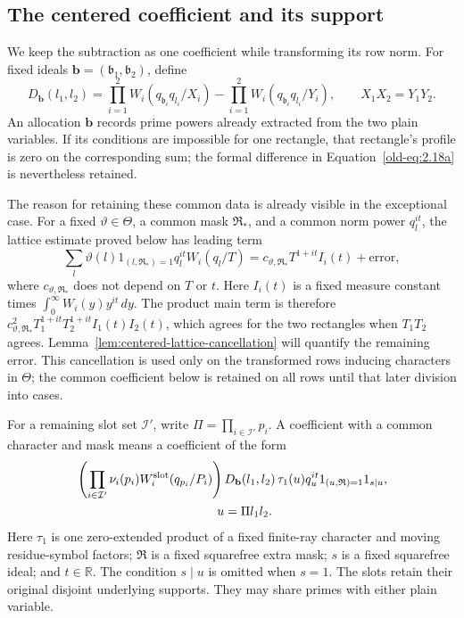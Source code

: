 \documentclass[12pt]{article}
\begin{document}
\subsection{The centered coefficient and its support}

We keep the subtraction as one coefficient while transforming its row
norm.  For fixed ideals
\(\mathbf b=(\mathfrak b_1,\mathfrak b_2)\), define
\begin{equation}
 D_{\mathbf b}(l_1,l_2)
 =
 \prod_{i=1}^2W_i(q_{\mathfrak b_i}q_{l_i}/X_i)
 -
 \prod_{i=1}^2W_i(q_{\mathfrak b_i}q_{l_i}/Y_i),
 \qquad X_1X_2=Y_1Y_2.
 \label{old-eq:2.18a}
\end{equation}
An allocation \(\mathbf b\) records prime powers already extracted
from the two plain variables.  If its conditions are impossible for
one rectangle, that rectangle's profile is zero on the corresponding
sum; the formal difference in Equation~\eqref{old-eq:2.18a} is
nevertheless retained.

The reason for retaining these common data is already visible in the
exceptional case.  For a fixed \(\vartheta\in\Theta\), a common mask
\(\mathfrak R_*\), and a common norm power \(q_l^{it}\), the lattice
estimate proved below has leading term
\[
 \sum_l\vartheta(l)1_{(l,\mathfrak R_*)=1}q_l^{it}W_i(q_l/T)
 =c_{\vartheta,\mathfrak R_*}T^{1+it}I_i(t)+\text{error},
\]
where \(c_{\vartheta,\mathfrak R_*}\) does not depend on \(T\) or \(t\).
Here \(I_i(t)\) is a fixed measure constant times
\(\int_0^\infty W_i(y)y^{it}\,dy\).
The product main term is therefore
\(c_{\vartheta,\mathfrak R_*}^2T_1^{1+it}T_2^{1+it}I_1(t)I_2(t)\),
which agrees for the two rectangles when \(T_1T_2\) agrees.
Lemma~\ref{lem:centered-lattice-cancellation} will quantify the remaining
error.  This cancellation is used only on the transformed rows inducing
characters in \(\Theta\); the common coefficient below is retained on
all rows until that later division into cases.

For a remaining slot set \(\mathcal I'\), write
\(\Pi=\prod_{i\in\mathcal I'}p_i\).  A coefficient with a common
character and mask means a coefficient of the form
\begin{equation}
 \begin{split}
 &\left(\prod_{i\in\mathcal I'}
       \nu_i(p_i)W_i^{\rm slot}(q_{p_i}/P_i)\right)
 D_{\mathbf b}(l_1,l_2)\,
 \tau_1(u)q_u^{it}
 1_{(u,\mathfrak R)=1}1_{s\mid u},\\
 &\hspace{40mm}u=\Pi l_1l_2.
 \end{split}
 \label{eq:centered-coefficient-form}
\end{equation}
Here \(\tau_1\) is one zero-extended product of a fixed finite-ray
character and moving residue-symbol factors; \(\mathfrak R\) is a
fixed squarefree extra mask; \(s\) is a fixed squarefree ideal; and
\(t\in\mathbb R\).  The condition \(s\mid u\) is omitted when
\(s=1\).  The slots retain their original disjoint underlying
supports.  They may share primes with either plain variable.
\end{document}
